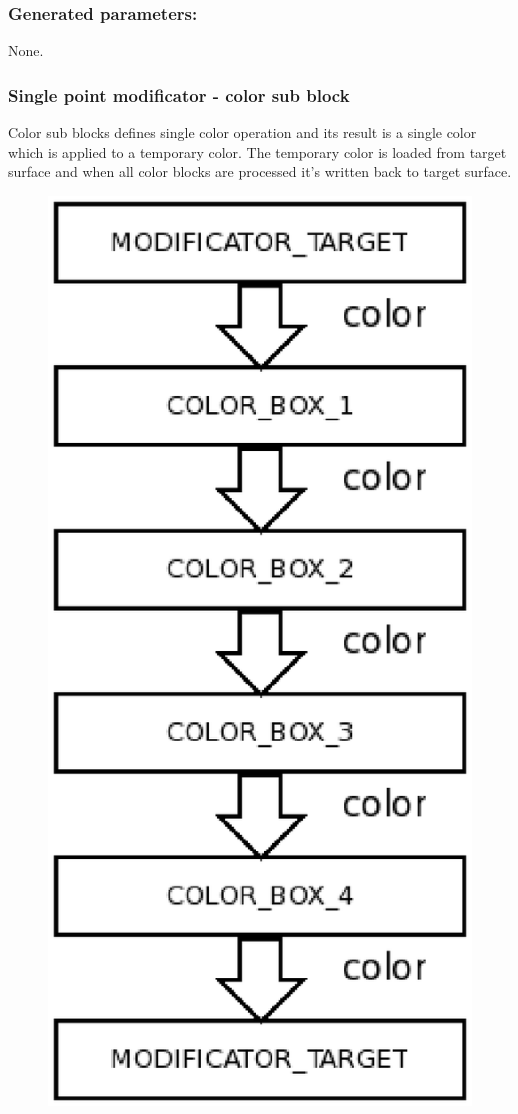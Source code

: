 \documentclass[9pt]{article}
\begin{document}
\subsubsection*{Generated parameters:}

None.

\subsubsection{Single point modificator - color sub block}

Color sub blocks defines single color operation and its result
is a single color which is applied to a temporary color. The temporary color
is loaded from target surface and when all color blocks are 
processed it's written back to target surface.
\begin{figure}[h]
\begin{center}
  \includegraphics[scale=0.6]{p04.eps}

\end{center}
\end{figure}
\end{document}
